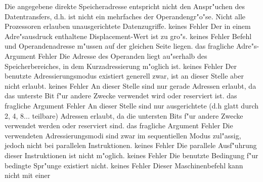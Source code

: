 \documentclass[12pt,a4paper,twoside]{report}
\begin{document}
\begin{description}
               {Die angegebene direkte Speicheradresse
                entspricht nicht den Anspr"uchen des Datentransfers, d.h.
                ist nicht ein mehrfaches der Operandengr"o"se.  Nicht alle
                Prozessoren erlauben unausgerichtete Datenzugriffe.}
               {keines}
               {Fehler}
               {Der in einem Adre"sausdruck enthaltene
                Displacement-Wert ist zu gro"s.}
               {keines}
               {Fehler}
               {Befehl und Operandenadresse m"ussen
                auf der gleichen Seite liegen.}
               {das fragliche Adre"s-Argument}
               {Fehler}
               {Die Adresse des Operanden liegt au"serhalb des
                Speicherbereiches, in dem Kurzadressierung m"oglich ist.}
               {keines}
               {Fehler}
               {Der benutzte Adressierungsmodus existiert
                generell zwar, ist an dieser Stelle aber nicht erlaubt.}
               {keines}
               {Fehler}
               {An dieser Stelle sind nur gerade Adressen erlaubt,
                da das unterste Bit f"ur andere Zwecke verwendet wird
                oder reserviert ist.}
               {das fragliche Argument}
               {Fehler}
               {An dieser Stelle sind nur ausgerichtete
                (d.h glatt durch 2, 4, 8... teilbare) Adressen erlaubt,
                da die untersten Bits f"ur andere Zwecke verwendet werden
                oder reserviert sind.}
               {das fragliche Argument}
               {Fehler}
               {Die verwendeten Adressierungsmodi
                sind zwar im sequentiellen Modus zul"assig, jedoch nicht
                bei parallelen Instruktionen.}
               {keines}
               {Fehler}
               {Die parallele Ausf"uhrung dieser Instruktionen
                ist nicht m"oglich.}
               {keines}
               {Fehler}
               {Die benutzte Bedingung f"ur bedingte Spr"unge
                existiert nicht.}
               {keines}
               {Fehler}
               {Dieser Maschinenbefehl kann nicht mit einer
}
\end{description}
\end{document}
